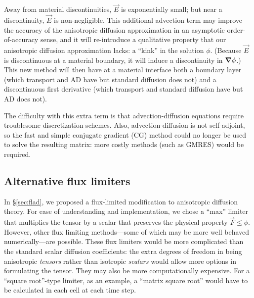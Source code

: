 Away from material discontinuities, $\vec{E}$ is exponentially small; but
near a discontinuity, $\vec{E}$ is non-negligible. This additional advection
term may
improve the accuracy of the anisotropic diffusion approximation in an
asymptotic order-of-accuracy sense, and it will re-introduce a qualitative
property that our anisotropic
diffusion approximation lacks: a ``kink'' in the solution $\phi$. (Because
$\vec{E}$ is discontinuous at a material boundary, it will induce a
discontinuity in $\bm{\nabla} \phi$.) This new method will then have at a material
interface both a boundary layer (which transport and AD have but standard
diffusion does not) and a discontinuous first derivative (which transport and
standard diffusion have but AD does not).

The difficulty with this extra term is that advection-diffusion equations
require troublesome discretization schemes. Also, advection-diffusion is
not self-adjoint,
so the fast and simple conjugate gradient (CG) method could no longer be used to
solve the resulting matrix: more costly methods (such as GMRES) would be
required.

\subsection{Alternative flux limiters}

In \S\ref{sec:flad}, we proposed a flux-limited modification to anisotropic
diffusion theory. For ease of understanding and implementation, we chose a
``max'' limiter that multiplies the tensor by a scalar that preserves the
physical property $\vec{F} \le \phi$. However, other flux limiting
methods---some of which may be more well behaved numerically---are possible.
These flux limiters would be more complicated than the standard scalar diffusion
coefficients: the extra degrees of freedom in being anisotropic
\emph{tensors} rather than isotropic \emph{scalars} would allow more options in
formulating the tensor.
They may also be more computationally expensive. For a ``square root''-type
limiter, as an
example, a ``matrix square root'' would have to be calculated in each cell at
each time step.


